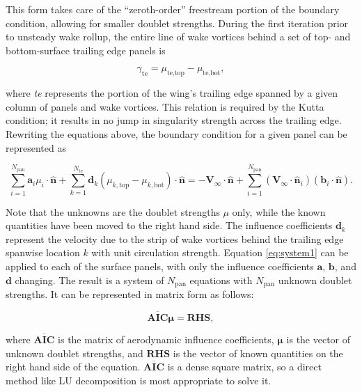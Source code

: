 \documentclass[11pt]{article}
\begin{document}
This form takes care of the ``zeroth-order'' freestream portion of the boundary
condition, allowing for smaller doublet strengths. During the first iteration
prior to unsteady wake rollup, the entire line of wake vortices behind a set of
top- and bottom-surface trailing edge panels is

\begin{equation}
\gamma_{\text{te}} = \mu_{\text{te,top}} - \mu_{\text{te,bot}},
\label{eq:wake_circ}
\end{equation}

\noindent where \emph{te} represents the portion of the wing's trailing edge
spanned by a given column of panels and wake vortices. This relation is required
by the Kutta condition; it results in no jump in singularity strength across the
trailing edge. Rewriting the equations above, the boundary condition for a given
panel can be represented as

\begin{equation}
  \sum_{i=1}^{N_{\text{pan}}}\mathbf{a}_i\mu_i\cdot\mathbf{\hat{n}}
+ \sum_{k=1}^{N_{\text{te}}}\mathbf{d}_k
    \left(\mu_{k,\text{top}} - \mu_{k,\text{bot}}\right)\cdot\mathbf{\hat{n}}
= -\mathbf{V}_\infty\cdot\mathbf{\hat{n}}
+ \sum_{i=1}^{N_{\text{pan}}}\left(\mathbf{V}_\infty\cdot\mathbf{\hat{n}}_i\right)
    \left(\mathbf{b}_i\cdot\mathbf{\hat{n}}\right).
\label{eq:system1}
\end{equation}

\noindent Note that the unknowns are the doublet strengths $\mu$ only, while the
known quantities have been moved to the right hand side. The influence
coefficients $\mathbf{d}_k$ represent the velocity due to the strip of wake
vortices behind the trailing edge spanwise location $k$ with unit circulation
strength. Equation \ref{eq:system1} can be
applied to each of the surface panels, with only the influence coefficients
$\mathbf{a}$, $\mathbf{b}$, and $\mathbf{d}$ changing. The result is a system of
$N_{\text{pan}}$ equations with $N_{\text{pan}}$ unknown doublet strengths. It
can be represented in matrix form as follows:

\begin{equation}
\mathbf{\overline{AIC}}\boldsymbol{\mu} = \mathbf{RHS},
\label{eq:system2}
\end{equation}

\noindent where $\mathbf{\overline{AIC}}$ is the matrix of aerodynamic influence
coefficients,
$\boldsymbol{\mu}$ is the vector of unknown doublet strengths, and $\mathbf{RHS}$ is the
vector of known quantities on the right hand side of the equation. $\mathbf{\overline{AIC}}$
is a
dense square matrix, so a direct method like LU decomposition is most appropriate to solve
it.
\end{document}
